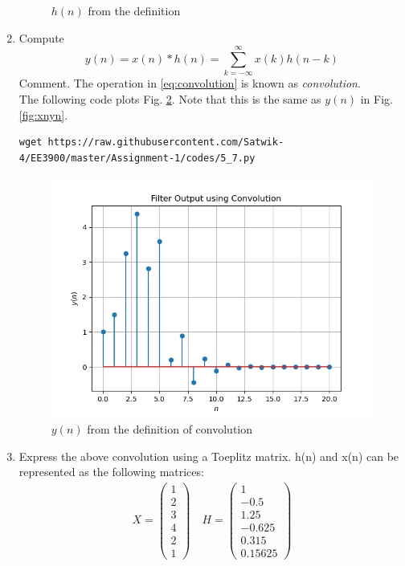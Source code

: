 \documentclass[journal,12pt,twocolumn]{IEEEtran}
\renewcommand\thesection{\arabic{section}}
\begin{document}
\begin{enumerate}[label=\thesection.\arabic*]
\begin{figure}[!ht]
\caption{$h(n)$ from the definition}
\label{fig:hndef}
\end{figure}
%
\item Compute 
%
\begin{equation}
\label{eq:convolution}
y(n) = x(n)*h(n) = \sum_{k=-\infty}^{\infty}x(k)h(n-k)
\end{equation}
%
Comment. The operation in \eqref{eq:convolution} is known as
{\em convolution}.
%
\\
\solution The following code plots Fig. \ref{fig:ynconv}. Note that this is the same as 
$y(n)$ in  Fig. 
\ref{fig:xnyn}. 
%
\begin{lstlisting}
wget https://raw.githubusercontent.com/Satwik-4/EE3900/master/Assignment-1/codes/5_7.py
\end{lstlisting}
\begin{figure}[!ht]
\centering
\includegraphics[width=\columnwidth]{figures/Figure_5.png}
\caption{$y(n)$ from the definition of convolution}
\label{fig:ynconv}
\end{figure}
\item Express the above convolution using a Toeplitz matrix.
\solution h(n) and x(n) can be represented as the following matrices:
\begin{align}
    X=\begin{pmatrix}1\\2\\3\\4\\2\\1
    \end{pmatrix}\quad
    H = \begin{pmatrix}1\\-0.5\\1.25\\-0.625\\0.315\\0.15625

\end{pmatrix}
\end{align}
\end{enumerate}
\end{document}
